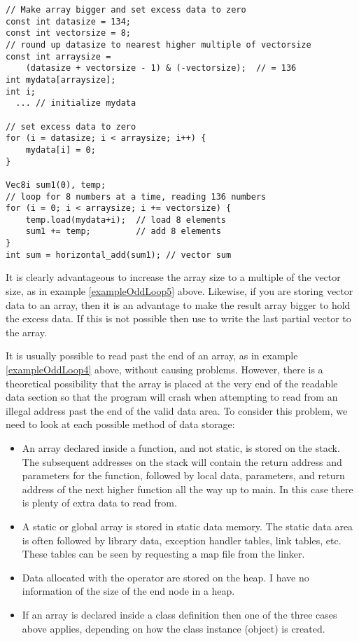 \documentclass[vcl_manual.tex]{subfiles}
\begin{document}
\begin{example}
\label{exampleOddLoop5}
\end{example}
\begin{lstlisting}[frame=single]
// Make array bigger and set excess data to zero
const int datasize = 134;
const int vectorsize = 8;
// round up datasize to nearest higher multiple of vectorsize
const int arraysize = 
    (datasize + vectorsize - 1) & (-vectorsize);  // = 136
int mydata[arraysize];
int i;
  ... // initialize mydata

// set excess data to zero
for (i = datasize; i < arraysize; i++) {
    mydata[i] = 0;
}

Vec8i sum1(0), temp;
// loop for 8 numbers at a time, reading 136 numbers
for (i = 0; i < arraysize; i += vectorsize) {
    temp.load(mydata+i);  // load 8 elements
    sum1 += temp;         // add 8 elements
}
int sum = horizontal_add(sum1); // vector sum
\end{lstlisting}


It is clearly advantageous to increase the array size to a multiple of the vector size, as in example \ref{exampleOddLoop5} above. Likewise, if you are storing vector data to an array, then it is an advantage to make the result array bigger to hold the excess data. If this is not possible then use  to write the last partial vector to the array.

It is usually possible to read past the end of an array, as in example \ref{exampleOddLoop4} above, without causing problems. However, there is a theoretical possibility that the array is placed at the very end of the readable data section so that the program will crash when attempting to read from an illegal address past the end of the valid data area. To consider this problem, we need to look at each possible method of data storage:
\begin{itemize}
  \item An array declared inside a function, and not static, is stored on the stack. The subsequent addresses on the stack will contain the return address and parameters for the function, followed by local data, parameters, and return address of the next higher function all the way up to main. In this case there is plenty of extra data to read from. 
  \item A static or global array is stored in static data memory. The static data area is often followed by library data, exception handler tables, link tables, etc. These tables can be seen by requesting a map file from the linker. 
  \item Data allocated with the operator  are stored on the heap. I have no information of the size of the end node in a heap.
  \item If an array is declared inside a class definition then one of the three cases above applies, depending on how the class instance (object) is created.
\end{itemize}
\end{document}

